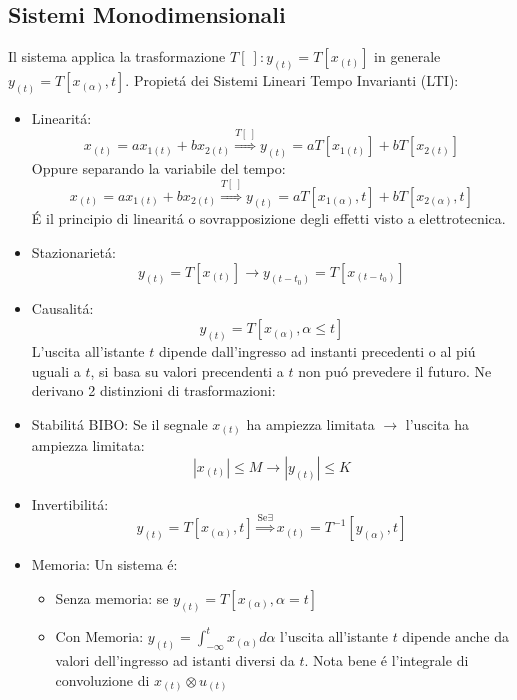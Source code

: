     \subsection{Sistemi Monodimensionali}
        Il sistema applica la trasformazione $T[\ ]: y_{(t)} = T[x_{(t)}]$ in generale \\ $y_{(t)} = T[x_{(\alpha)},t]$. 
        Propietá dei Sistemi Lineari Tempo Invarianti (LTI):
        \begin{itemize}
            \item {Linearitá:
                \[
                    x_{(t)} = ax_{1(t)}+bx_{2(t)} \overset{T[\ ]}{\Rightarrow} y_{(t)} = aT[x_{1(t)}]+b T[x_{2(t)}]
                \]
                Oppure separando la variabile del tempo:
                \[
                    x_{(t)} = ax_{1(t)}+bx_{2(t)} \overset{T[\ ]}{\Rightarrow} y_{(t)} = aT[x_{1(\alpha)},t]+b T[x_{2(\alpha)},t]
                \]
                É il principio di linearitá o sovrapposizione degli effetti visto a elettrotecnica.
            }
            \item {Stazionarietá:
                \[
                    y_{(t)} = T[x_{(t)}] \rightarrow y_{(t-t_0)} = T[x_{(t-t_0)}]  
                \]
            }
            \item {Causalitá:
                \[
                    y_{(t)} = T[x_{(\alpha)},\alpha\leq t]
                \]
                L'uscita all'istante $t$ dipende dall'ingresso ad instanti precedenti o al piú uguali a $t$, si basa su valori precendenti a 
                $t$ non puó prevedere il futuro. Ne derivano 2 distinzioni di trasformazioni:
            }
            \item {Stabilitá BIBO:
                Se il segnale $x_{(t)}$ ha ampiezza limitata $\rightarrow$ l'uscita ha ampiezza limitata:
                    \[
                        |x_{(t)}|\leq M \rightarrow |y_{(t)}|\leq K 
                    \]
            }
            \item {Invertibilitá:
                \[
                    y_{(t)} = T[x_{(\alpha)},t] \overset{\text{Se} \exists}{\Rightarrow} x_{(t)} = T^{-1}[y_{(\alpha)},t]
                \]
            }
            \item {Memoria:
                Un sistema é:
                \begin{itemize}
                    \item {Senza memoria: se $y_{(t)} = T[x_{(\alpha)},\alpha=t]$}
                    \item {Con Memoria: $y_{(t)} =\int_{-\infty}^{t}x_{(\alpha)} d\alpha$ l'uscita all'istante $t$ dipende anche da valori dell'ingresso 
                          ad istanti diversi da $t$. Nota bene é l'integrale di convoluzione di $x_{(t)} \otimes u_{(t)}$ 
                    }
                \end{itemize}
            }
        \end{itemize}
